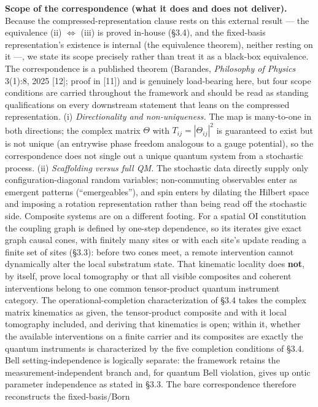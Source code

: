 \documentclass[
]{article}
\begin{document}
\textbf{Scope of the correspondence (what it does and does not
deliver).} Because the compressed-representation clause rests on this
external result --- the equivalence (ii) \(\iff\) (iii) is proved
in-house (§3.4), and the fixed-basis representation's existence is
internal (the equivalence theorem), neither resting on it ---, we state
its scope precisely rather than treat it as a black-box equivalence. The
correspondence is a published theorem (Barandes, \emph{Philosophy of
Physics} 3(1):8, 2025 {[}12{]}; proof in {[}11{]}) and is genuinely
load-bearing here, but four scope conditions are carried throughout the
framework and should be read as standing qualifications on every
downstream statement that leans on the compressed representation. (i)
\emph{Directionality and non-uniqueness.} The map is many-to-one in both
directions; the complex matrix \(\Theta\) with
\(T_{ij}=|\Theta_{ij}|^2\) is guaranteed to exist but is not unique (an
entrywise phase freedom analogous to a gauge potential), so the
correspondence does not single out a unique quantum system from a
stochastic process. (ii) \emph{Scaffolding versus full QM.} The
stochastic data directly supply only configuration-diagonal random
variables; non-commuting observables enter as emergent patterns
(``emergeables''), and spin enters by dilating the Hilbert space and
imposing a rotation representation rather than being read off the
stochastic side. Composite systems are on a different footing. For a
spatial OI constitution the coupling graph is defined by one-step
dependence, so its iterates give exact graph causal cones, with finitely
many sites or with each site's update reading a finite set of sites
(§3.3): before two cones meet, a remote intervention cannot dynamically
alter the local substratum state. That kinematic locality does
\textbf{not}, by itself, prove local tomography or that all visible
composites and coherent interventions belong to one common
tensor-product quantum instrument category. The operational-completion
characterization of §3.4 takes the complex matrix kinematics as given,
the tensor-product composite and with it local tomography included, and
deriving that kinematics is open; within it, whether the available
interventions on a finite carrier and its composites are exactly the
quantum instruments is characterized by the five completion conditions
of §3.4. Bell setting-independence is logically separate: the framework
retains the measurement-independent branch and, for quantum Bell
violation, gives up ontic parameter independence as stated in §3.3. The
bare correspondence therefore reconstructs the fixed-basis/Born
\end{document}
